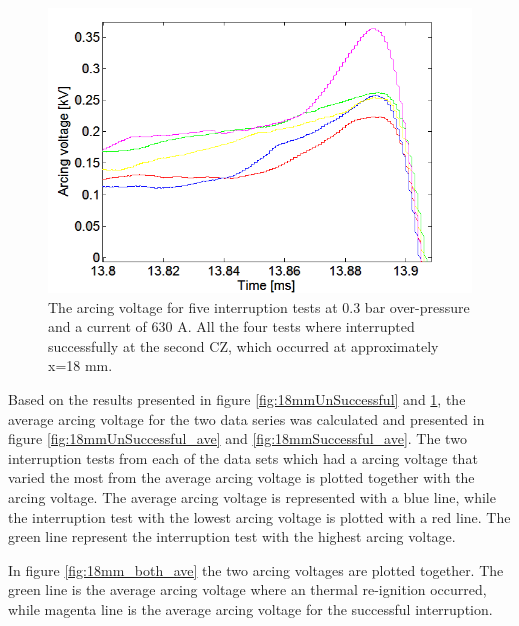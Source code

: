\documentclass[10pt,b5paper,twoside]{article}
\begin{document}
\begin{figure}[H]
\centering
\includegraphics[scale=0.6, angle =0 ]{Bilder/Results/ArcingVoltage_18_none_reIgnition.png}
\caption{The arcing voltage for five interruption tests at 0.3 bar over-pressure and a current of 630 A. All the four tests where interrupted successfully at the second CZ, which occurred at approximately  x=18 mm.} \label{fig:18mmSuccessful}
\end{figure}

Based on the results presented in figure \ref{fig:18mmUnSuccessful} and \ref{fig:18mmSuccessful}, the average arcing voltage for the two data series was calculated and presented in figure \ref{fig:18mmUnSuccessful_ave} and \ref{fig:18mmSuccessful_ave}. The two interruption tests from each of the data sets which had a arcing voltage that varied the most from the average arcing voltage is plotted together with the arcing voltage. The average arcing voltage is represented with a blue line, while the interruption test with the lowest arcing voltage is plotted with a red line. The green line represent the interruption test with the highest arcing voltage. 

In figure \ref{fig:18mm_both_ave} the two arcing voltages are plotted together. The green line is the average arcing voltage where an thermal re-ignition occurred, while magenta line is the average arcing voltage for the successful interruption.
\end{document}
